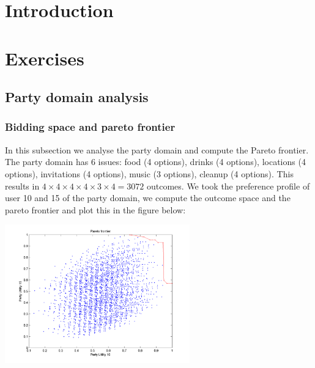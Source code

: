 \documentclass[a4paper,10pt]{article}
\title{\maintitle\\\subtitle}
\author{\authorbd\\\authoroh\\\authortr\\\authoras\\\authortv}
\date{\today}
\begin{document}
\maketitle

\section{Introduction}
\label{sec:introduction}


\newpage
\tableofcontents
\newpage


\section{Exercises}
\label{sec:exercises}

\subsection{Party domain analysis}

\subsubsection{Bidding space and pareto frontier}

In this subsection we analyse the party domain and compute the Pareto frontier.
The party domain has 6 issues: food (4 options), drinks (4 options), 
locations (4 options), invitations (4 options), music (3 options), cleanup (4 options).
This results in $4 \times 4 \times 4 \times 4 \times 3 \times 4 = 3072$ outcomes.
We took the preference profile of user 10 and 15 of the party domain,
we compute the outcome space and the pareto frontier and plot this in the figure below:

\begin{center}
 \includegraphics[width=0.6\textwidth]{pareto.png}
\end{center}
\end{document}

